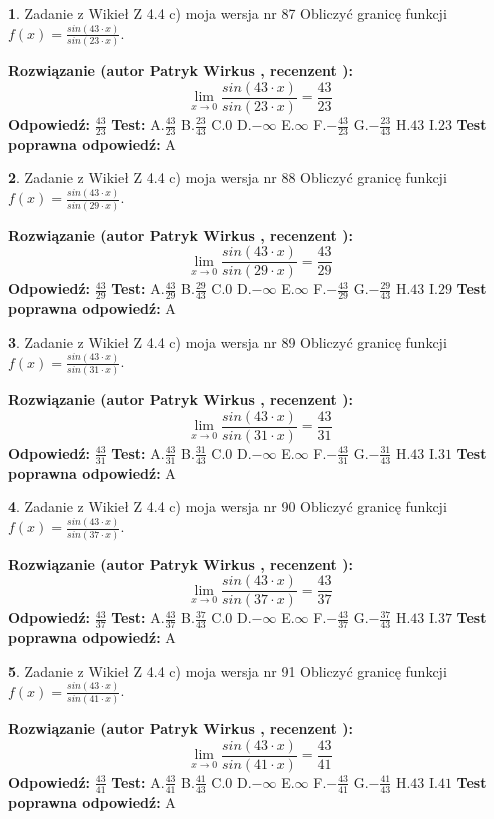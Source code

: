 \documentclass[12pt, a4paper]{article}
\theoremstyle{definition} %
\newtheorem{zad}{}
\newcommand{\zadStart}[1]{\begin{zad}#1\newline}
\newcommand{\zadStop}{\end{zad}}
\newcommand{\rozwStart}[2]{\noindent \textbf{Rozwiązanie (autor #1 , recenzent #2): }\newline}
\newcommand{\rozwStop}{\newline}
\newcommand{\odpStart}{\noindent \textbf{Odpowiedź:}\newline}
\newcommand{\odpStop}{\newline}
\newcommand{\testStart}{\noindent \textbf{Test:}\newline}
\newcommand{\testStop}{\newline}
\newcommand{\kluczStart}{\noindent \textbf{Test poprawna odpowiedź:}\newline}
\newcommand{\kluczStop}{\newline}
\begin{document}
\zadStart{Zadanie z Wikieł Z 4.4 c) moja wersja nr 87}
Obliczyć granicę funkcji $f(x)=\frac{sin(43\cdot x)}{sin(23\cdot x)}$.
\zadStop
\rozwStart{Patryk Wirkus}{}
$$\lim\limits_{x\to 0}\frac{sin(43\cdot x)}{sin(23\cdot x)}=
\frac{43}{23}$$
\rozwStop
\odpStart
$\frac{43}{23}$
\odpStop
\testStart
A.$\frac{43}{23}$
B.$\frac{23}{43}$
C.$0$
D.$-\infty$
E.$\infty$
F.$-\frac{43}{23}$
G.$-\frac{23}{43}$
H.$43$
I.$23$
\testStop
\kluczStart
A
\kluczStop



\zadStart{Zadanie z Wikieł Z 4.4 c) moja wersja nr 88}
Obliczyć granicę funkcji $f(x)=\frac{sin(43\cdot x)}{sin(29\cdot x)}$.
\zadStop
\rozwStart{Patryk Wirkus}{}
$$\lim\limits_{x\to 0}\frac{sin(43\cdot x)}{sin(29\cdot x)}=
\frac{43}{29}$$
\rozwStop
\odpStart
$\frac{43}{29}$
\odpStop
\testStart
A.$\frac{43}{29}$
B.$\frac{29}{43}$
C.$0$
D.$-\infty$
E.$\infty$
F.$-\frac{43}{29}$
G.$-\frac{29}{43}$
H.$43$
I.$29$
\testStop
\kluczStart
A
\kluczStop



\zadStart{Zadanie z Wikieł Z 4.4 c) moja wersja nr 89}
Obliczyć granicę funkcji $f(x)=\frac{sin(43\cdot x)}{sin(31\cdot x)}$.
\zadStop
\rozwStart{Patryk Wirkus}{}
$$\lim\limits_{x\to 0}\frac{sin(43\cdot x)}{sin(31\cdot x)}=
\frac{43}{31}$$
\rozwStop
\odpStart
$\frac{43}{31}$
\odpStop
\testStart
A.$\frac{43}{31}$
B.$\frac{31}{43}$
C.$0$
D.$-\infty$
E.$\infty$
F.$-\frac{43}{31}$
G.$-\frac{31}{43}$
H.$43$
I.$31$
\testStop
\kluczStart
A
\kluczStop



\zadStart{Zadanie z Wikieł Z 4.4 c) moja wersja nr 90}
Obliczyć granicę funkcji $f(x)=\frac{sin(43\cdot x)}{sin(37\cdot x)}$.
\zadStop
\rozwStart{Patryk Wirkus}{}
$$\lim\limits_{x\to 0}\frac{sin(43\cdot x)}{sin(37\cdot x)}=
\frac{43}{37}$$
\rozwStop
\odpStart
$\frac{43}{37}$
\odpStop
\testStart
A.$\frac{43}{37}$
B.$\frac{37}{43}$
C.$0$
D.$-\infty$
E.$\infty$
F.$-\frac{43}{37}$
G.$-\frac{37}{43}$
H.$43$
I.$37$
\testStop
\kluczStart
A
\kluczStop



\zadStart{Zadanie z Wikieł Z 4.4 c) moja wersja nr 91}
Obliczyć granicę funkcji $f(x)=\frac{sin(43\cdot x)}{sin(41\cdot x)}$.
\zadStop
\rozwStart{Patryk Wirkus}{}
$$\lim\limits_{x\to 0}\frac{sin(43\cdot x)}{sin(41\cdot x)}=
\frac{43}{41}$$
\rozwStop
\odpStart
$\frac{43}{41}$
\odpStop
\testStart
A.$\frac{43}{41}$
B.$\frac{41}{43}$
C.$0$
D.$-\infty$
E.$\infty$
F.$-\frac{43}{41}$
G.$-\frac{41}{43}$
H.$43$
I.$41$
\testStop
\kluczStart
A
\kluczStop
\end{document}
